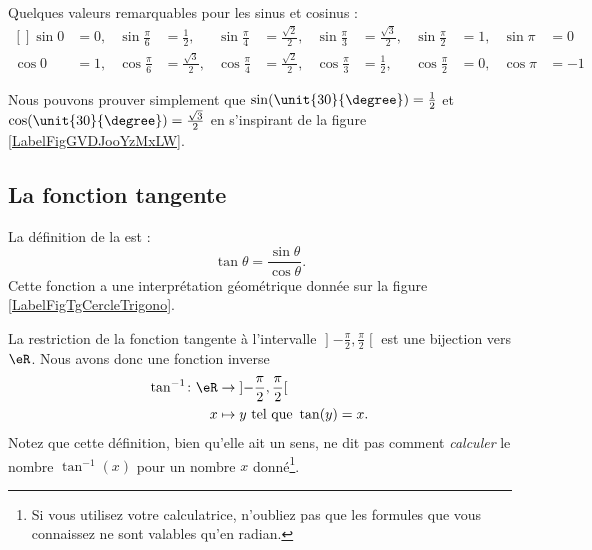 Quelques valeurs remarquables pour les sinus et cosinus :
\begin{equation}
	\begin{aligned}[]
		\sin 0&=0,&\sin\frac{ \pi }{ 6 }&=\frac{ 1 }{2},&\sin\frac{ \pi }{ 4 }&=\frac{ \sqrt{2} }{2},&\sin\frac{ \pi }{ 3 }&=\frac{ \sqrt{3} }{2},&\sin\frac{ \pi }{2}&=1,&\sin\pi&=0\\
		\cos 0&=1,&\cos\frac{ \pi }{ 6 }&=\frac{ \sqrt{3} }{2},&\cos\frac{ \pi }{ 4 }&=\frac{ \sqrt{2} }{2},&\cos\frac{ \pi }{ 3 }&=\frac{ 1 }{2},&\cos\frac{ \pi }{2}&=0,&\cos\pi&=-1
	\end{aligned}
\end{equation}

Nous pouvons prouver simplement que $\sin(\unit{30}{\degree})=\frac{ 1 }{2}$ et $\cos(\unit{30}{\degree})=\frac{ \sqrt{3} }{2}$ en s'inspirant de la figure \ref{LabelFigGVDJooYzMxLW}. %
\newcommand{\CaptionFigGVDJooYzMxLW}{Un triangle équilatéral de côté $1$.}


\subsection{La fonction tangente}

La définition de la  est :
\begin{equation}
	\tan\theta=\frac{ \sin\theta }{ \cos\theta }.
\end{equation}
Cette fonction a une interprétation géométrique donnée sur la figure \ref{LabelFigTgCercleTrigono}.
\newcommand{\CaptionFigTgCercleTrigono}{Interprétation géométrique de la fonction tangente. La tangente de l'angle $\theta$ est positive (et un peu plus grande que $1$) tandis que celle de la tangente de l'angle $\varphi$ est négative.}


La restriction de la fonction tangente à l'intervalle $\mathopen] -\frac{ \pi }{2} , \frac{ \pi }{2} \mathclose[$ est une bijection vers $\eR$. Nous avons donc une fonction inverse
\begin{equation}
	\begin{aligned}
		\tan^{-1}\colon \eR&\to \mathopen] -\frac{ \pi }{2} , \frac{ \pi }{2} \mathclose[ \\
        x&\mapsto y \text{ tel que } \tan(y)=x.
	\end{aligned}
\end{equation}
Notez que cette définition, bien qu'elle ait un sens, ne dit pas comment \emph{calculer} le nombre $\tan^{-1}(x)$ pour un nombre $x$ donné\footnote{Si vous utilisez votre calculatrice, n'oubliez pas que les formules que vous connaissez ne sont valables qu'en radian.}.

